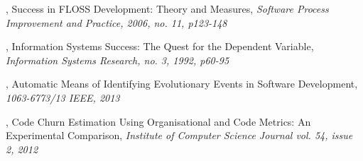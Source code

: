 \begin{thebibliography}{99}
	 \rm,
		Success in FLOSS Development: Theory and Measures, \emph{Software Process
		Improvement and Practice, 2006, no. 11, p123-148}\rm

\begin{comment}
		Crowston et al. studied the success of FLOSS projects. They reconsider what
		success means in a FLOSS context. They elaborated on the literature study
		conducted in \cite{crowston2003} and extended this conclusions by a critical
		evaluation on the measures defined therein.
		
		These new insights are useful in defining metrics to determine a project's
		health and activity.
\end{comment}

	 \rm, Information Systems
		Success: The Quest for the Dependent Variable, \emph{Information Systems
		Research, no. 3, 1992, p60-95}
	
	 \rm, Automatic Means of Identifying
		Evolutionary Events in Software Development, \emph{1063-6773/13 IEEE, 2013}\rm

\begin{comment}
		This is the base paper of the Master's project.
		Karus has explored the usage of wavelet transforms for the analysis of OSS
		projects evolution. Karus was able to detect close to 1,000 similar patterns
		in a subset of 27 OSS projects. In conclusion, the analysis reveals that
		wavelet analysis can be a powerful and objective tool for identifying
		evolutionary events that can be used as estimation basis or management guide
		in software projects.

		During this Master's project I will replicate and extend the work of Karus by
		comparing patterns and events in order to validate wavelet analysis as a tool
		to predict end of software evolution. This will be done using a larger data
		set and a critical validation of the results found in the base paper.
\end{comment}

	 \rm, Code Churn Estimation
		Using Organisational and Code Metrics: An Experimental Comparison,
		\emph{Institute of Computer Science Journal vol. 54, issue 2, 2012}\rm

\begin{comment}
		Karus and Dumas studied a means to estimate future code maintenance effort in
		order to plan software maintenance activities. In this paper they used machine
		learning techniques to unveil predictors of yearly cumulative code churn of
		software projects on the basis of metrics extracted from version control
		systems. They have shown that a code churn estimation model built purely with
		organisational metrics is superior to one built purely with code metrics.
		However, a combined model provides the highest predictive power. Code metrics
		in general are complementary to organisational metrics for the purpose of
		estimating code churn.


\end{comment}
\end{thebibliography}
